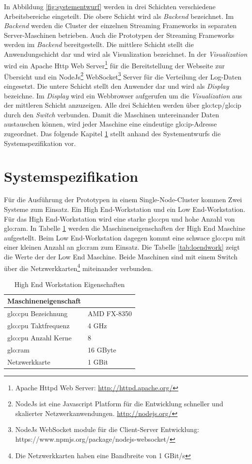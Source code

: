 In Abbildung \ref{fig:systementwurf} werden in drei Schichten verschiedene Arbeitsbereiche eingeteilt. Die obere Schicht wird als \textit{Backend} bezeichnet. Im \textit{Backend} werden die Cluster der einzelnen Streaming Frameworks in separaten Server-Maschinen betrieben. Auch die Prototypen der Streaming Frameworks werden im \textit{Backend} bereitgestellt. Die mittlere Schicht stellt die Anwendungschicht dar und wird als Visualization bezeichnet. In der \textit{Visualization} wird ein Apache Http Web Server\footnote{Apache Httpd Web Server: \url{http://httpd.apache.org/}} für die Bereitstellung der Webseite zur Übersicht und ein NodeJs\footnote{NodeJs ist eine Javascript Platform für die Entwicklung schneller und skalierter Netzwerkanwendungen. \url{http://nodejs.org/}} WebSocket\footnote{NodeJs WebSocket module für die Client-Server Entwicklung: https://www.npmjs.org/package/nodejs-websocket/} Server für die Verteilung der Log-Daten eingesetzt. Die untere Schicht stellt den Anwender dar und wird als \textit{Display} bezeichne. Im \textit{Display} wird ein Webbrowser aufgerufen um die \textit{Visualization} aus der mittleren Schicht anzuzeigen. Alle drei Schichten werden über \gls{glo:tcp}/\gls{glo:ip} durch den \textit{Switch} verbunden. Damit die Maschinen untereinander Daten austauschen können, wird jeder Maschine eine eindeutige \gls{glo:ip}-Adresse zugeordnet. Das folgende Kapitel \ref{sec:systemspezifiaktion} stellt anhand des Systementwurfs die Systemspezifikation vor.


\section{Systemspezifikation}
\label{sec:systemspezifiaktion}

Für die Ausführung der Prototypen in einem Single-Node-Cluster kommen Zwei Systeme zum Einsatz. Ein High End-Workstation und ein Low End-Workstation. Für das High End-Workstation wird eine starke \gls{glo:cpu} und hohe Anzahl von \gls{glo:ram}. In Tabelle \ref{tab:hiendwork} werden die Maschineneigenschaften der High End Maschine aufgestellt. Beim Low End-Workstation dagegen kommt eine schwace \gls{glo:cpu} mit einer kleinen Anzahl an \gls{glo:ram} zum Einsatz. Die Tabelle \ref{tab:loendwork} zeigt die Werte der der Low End Maschine. Beide Maschinen sind mit einem Switch über die Netzwerkkarten\footnote{Die Netzwerkkarten haben eine Bandbreite von 1 GBit/s} miteinander verbunden. 

\begin{table}[ht]
	\centering
		\begin{tabular}{@{}ll@{}} \toprule
			\textbf{Maschineneigenschaft} &  \\ \midrule
			\gls{glo:cpu} Bezeichnung & AMD FX-8350 \\
			\gls{glo:cpu} Taktfrequenz & 4 GHz \\
			\gls{glo:cpu} Anzahl Kerne & 8 \\
			\gls{glo:ram} & 16 GByte \\
			Netzwerkkarte & 1 GBit \\
			\bottomrule			
		\end{tabular}
	\caption{High End Workstation Eigenschaften}
	\label{tab:hiendwork}
\end{table}

